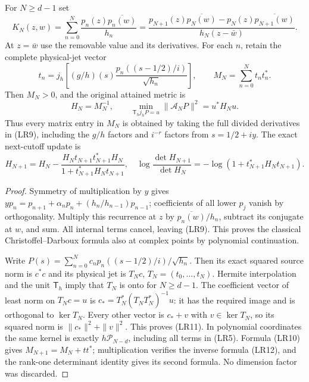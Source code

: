 \begin{hzocproposition}
For $N\ge d-1$ set
\[
 K_N(z,w)=\sum_{n=0}^N\frac{p_n(z)\overline{p_n(w)}}{h_n}
 =\frac{p_{N+1}(z)\overline{p_N(w)}-
 p_N(z)\overline{p_{N+1}(w)}}{h_N(z-\bar w)}.\tag{LR9}
\]
At $z=\bar w$ use the removable value and its derivatives.
For each $n$, retain the complete physical-jet vector
\[
 t_n=j_h\left[(g/h)(s)\frac{p_n((s-1/2)/i)}{\sqrt{h_n}}\right],
 \qquad M_N=\sum_{n=0}^N t_nt_n^*.\tag{LR10}
\]
Then $M_N>0$, and the original attained metric is
\[
 H_N=M_N^{-1},\qquad
 \min_{\mathsf T_hj_hP=u}\|\mathcal A_NP\|^2=u^*H_Nu.
 \tag{LR11}
\]
Thus every matrix entry in $M_N$ is obtained by taking the full divided
derivatives in (LR9), including the $g/h$ factors and $i^{-r}$ factors
from $s=1/2+iy$. The exact next-cutoff update is
\[
 H_{N+1}=H_N-\frac{H_Nt_{N+1}t_{N+1}^*H_N}
 {1+t_{N+1}^*H_Nt_{N+1}},\quad
 \log\frac{\det H_{N+1}}{\det H_N}
 =-\log(1+t_{N+1}^*H_Nt_{N+1}).\tag{LR12}
\]
\end{hzocproposition}
\begin{proof}
Symmetry of multiplication by $y$ gives
$yp_n=p_{n+1}+\alpha_np_n+(h_n/h_{n-1})p_{n-1}$; coefficients
of all lower $p_j$ vanish by orthogonality. Multiply this recurrence
at $z$ by $\overline{p_n(w)}/h_n$, subtract its conjugate at $w$,
and sum. All internal terms cancel, leaving (LR9). This proves the
classical Christoffel--Darboux formula \cite[18.2.12]{hzoc:DLMF18}
also at complex points by polynomial continuation.

Write $P(s)=\sum_{n=0}^N c_np_n((s-1/2)/i)/\sqrt{h_n}$.
Then its exact squared source norm is $c^*c$ and its physical jet is
$T_Nc$, $T_N=(t_0,\ldots,t_N)$. Hermite interpolation and the unit
$\mathsf T_h$ imply that $T_N$ is onto for $N\ge d-1$.
The coefficient vector of least norm on $T_Nc=u$ is
$c_*=T_N^*(T_NT_N^*)^{-1}u$: it has the required image and is
orthogonal to $\ker T_N$. Every other vector is $c_*+v$ with
$v\in\ker T_N$, so its squared norm is $\|c_*\|^2+\|v\|^2$.
This proves (LR11). In polynomial coordinates the same kernel is
exactly $h\mathcal P_{N-d}$, including all terms in (LR5).
Formula (LR10) gives $M_{N+1}=M_N+tt^*$; multiplication verifies
the inverse formula (LR12), and the rank-one determinant identity
gives its second formula. No dimension factor was discarded.
\end{proof}

